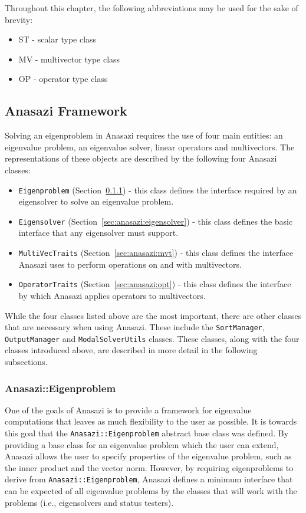 Throughout this chapter, the following abbreviations may be used for the sake of
brevity:
\begin{itemize}
\item ST - scalar type class
\item MV - multivector type class
\item OP - operator type class
\end{itemize}

\subsection{Anasazi Framework}
\label{sec:anasazi:framework}

Solving an eigenproblem in Anasazi requires the use of four main entities: an
eigenvalue problem, an eigenvalue solver, linear operators and multivectors. The
representations of these objects are described by the following four Anasazi
classes:
\begin{itemize}
\item \verb!Eigenproblem! (Section~\ref{sec:anasazi:eigenproblem}) - this class defines the interface required by an
eigensolver to solve an eigenvalue problem.
\item \verb!Eigensolver! (Section~\ref{sec:anasazi:eigensolver}) - this class defines the basic interface that any
eigensolver must support.
\item \verb!MultiVecTraits! (Section~\ref{sec:anasazi:mvt}) - this class defines the interface Anasazi uses to 
perform operations on and with multivectors.
\item \verb!OperatorTraits! (Section~\ref{sec:anasazi:opt}) - this class defines the interface by which Anasazi
applies operators to multivectors.
\end{itemize}

While the four classes listed above are the most important, there are other
classes that are necessary when using Anasazi. These include the
\verb!SortManager!, \verb!OutputManager! and \verb!ModalSolverUtils! classes.
These classes, along with the four classes introduced above, are described in
more detail in the following subsections.

\subsubsection{Anasazi::Eigenproblem}
\label{sec:anasazi:eigenproblem}

One of the goals of Anasazi is to provide a framework for eigenvalue
computations that leaves as much flexibility to the user as possible. It is
towards this goal that the \verb!Anasazi::Eigenproblem! abstract base class was
defined. By providing a base class for an eigenvalue problem which the user can
extend, Anasazi allows the user to specify properties of the eigenvalue problem,
such as the inner product and the vector norm. However, by requiring
eigenproblems to derive from \verb!Anasazi::Eigenproblem!, Anasazi defines a
minimum interface that can be expected of all eigenvalue problems by the classes
that will work with the problems (i.e., eigensolvers and status testers).

